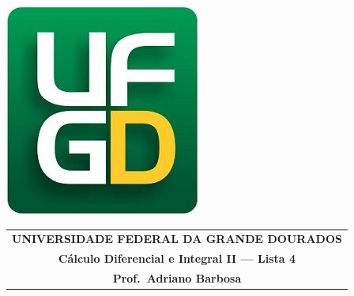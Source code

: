 \documentclass[a4paper,5pt]{amsbook}
\begin{document}
\thispagestyle{empty}
\pagestyle{empty}
\begin{minipage}[h]{0.14\textwidth}
	\includegraphics[scale=0.24]{../../ufgd.png}
\end{minipage}
\begin{minipage}[h]{\textwidth}
\begin{tabular}{c}
{{\bf UNIVERSIDADE FEDERAL DA GRANDE DOURADOS}}\\
{{\bf C\'{a}lculo Diferencial e Integral II --- Lista 4}}\\
{{\bf Prof.\ Adriano Barbosa}}\\
\end{tabular}
\vspace{-0.45cm}
%
\end{minipage}

\end{document}
